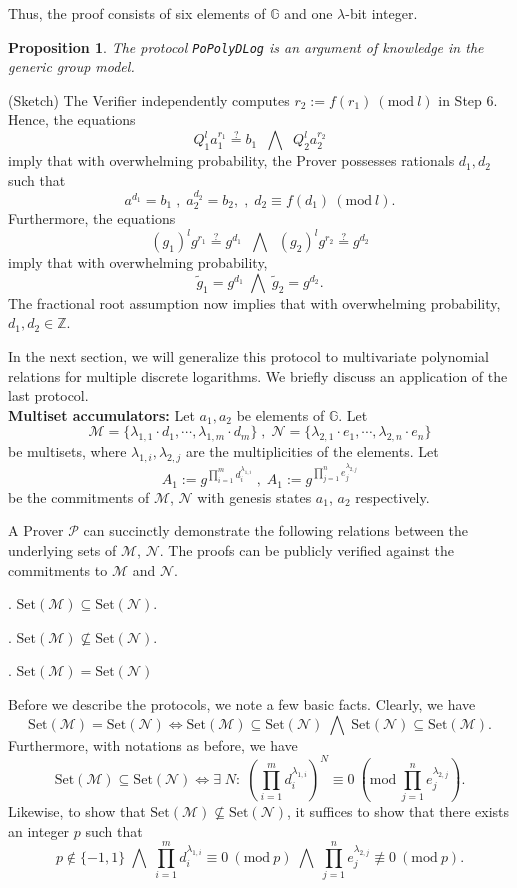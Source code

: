 \documentclass[11pt, lettersize, notitlepage, leqno, footskip=0.6cm]{article}
\newcommand{\bz}{\mathbb Z}
\newcommand{\pl}{\prod\limits}
\newcommand{\sett}{\mr{Set}}
\newcommand{\LRA}{\Longleftrightarrow}
\newcommand{\wti}{\widetilde}
\newcommand{\mc}{\mathcal}
\newcommand{\mb}{\mathbb}
\newcommand{\mr}{\mathrm}
\newcommand{\lam}{\lambda}
\newcommand{\sub}{\subseteq}
\newcommand{\nsub}{\nsubseteq}
\newcommand{\mP}{\mc{P}}
\newcommand{\vs}{\vspace{-0.15cm}}
\newcommand{\noin}{\noindent}
\newcommand{\op}{overwhelming probability}
\newcommand{\Mod}[1]{\ (\mathrm{mod}\ #1)}
\newtheorem{Prop}[Thm]{Proposition}
\numberwithin{equation}{section}
\begin{document}
\noindent Thus, the proof consists of six elements of $\mb{G}$ and one $\lam$-bit integer.

\begin{Prop} The protocol \verb|PoPolyDLog| is an argument of knowledge in the generic group
model.\end{Prop}

\begin{prf} (Sketch) The Verifier independently computes $r_2:= f(r_1)\Mod{l}$ in Step 6. Hence, the equations $$Q_1^{l}a_1^{r_1}\stackrel{?}{=} b_1\;\;\bigwedge\;\; Q_2^{l}a_2^{r_2}$$ imply that with \op, the Prover possesses rationals $d_1,d_2$ such that $$a^{d_1} = b_1\;,\;a_2^{d_2} = b_2,\;,\;d_2\equiv f(d_1)\Mod{l}.$$ Furthermore, the equations \vs $$(g_1)^lg^{r_1} \stackrel{?}{=} g^{d_1}\;\;\bigwedge\;\; (g_2)^lg^{r_2} \stackrel{?}{=} g^{d_2} $$ imply that with \op, \vs $$\wti{g}_1 = g^{d_1}\;\bigwedge\;\wti{g}_2 = g^{d_2}. $$ The fractional root assumption now implies that with \op, $d_1,d_2\in \bz$.\end{prf}

\noin In the next section, we will generalize this protocol to multivariate polynomial relations for multiple discrete logarithms. We briefly discuss an application of the last protocol.\\

\noin \textbf{Multiset accumulators:} Let $a_1,a_2$ be elements of $\mb{G}$. Let \vs $$\mc{M} = \{\lam_{1,1}\cdot d_1,\cdots, \lam_{1,m}\cdot d_m \}\;,\;\mc{N} = \{\lam_{2,1}\cdot e_1,\cdots, \lam_{2,n}\cdot e_n \}$$ be multisets, where $\lam_{1,i}, \lam_{2,j}$ are the multiplicities of the elements. Let \vs $$A_1:= g^{\pl_{i=1}^m d_i^{\lam_{1,i}}}\;,\; A_1:= g^{\pl_{j=1}^n e_j^{\lam_{2,j}}}$$ be the commitments of $\mc{M}$, $\mc{N}$ with genesis states $a_1$, $a_2$ respectively.

A Prover $\mP$ can succinctly demonstrate the following relations between the underlying sets of $\mc{M}$, $\mc{N}$. The proofs can be publicly verified against the commitments to $\mc{M}$ and $\mc{N}$.\vspace{0.1cm}

\noin 1. $\sett(\mc{M})\sub \sett(\mc{N})$.

\noin 2. $\sett(\mc{M})\nsub \sett(\mc{N})$.

\noin 3. $\sett(\mc{M}) = \sett(\mc{N})$ \vspace{0.1cm}

\noin Before we describe the protocols, we note a few basic facts. Clearly, we have \vs $$\sett(\mc{M}) = \sett(\mc{N})\LRA \sett(\mc{M}) \sub \sett(\mc{N})\;\bigwedge\; \sett(\mc{N}) \sub \sett(\mc{M}).$$ Furthermore, with notations as before, we have \vs $$\sett(\mc{M})\sub \sett(\mc{N})\LRA \exists\; N:\;(\pl_{i=1}^m d_i^{\lam_{1,i}})^N\equiv 0\Mod{\pl_{j=1}^n e_j^{\lam_{2,j}}}.$$ Likewise, to show that $\sett(\mc{M})\nsub \sett(\mc{N})$, it suffices to show that there exists an integer $p$ such that \vs $$p\notin \{-1,1\}   \;\bigwedge\;\pl_{i=1}^m d_i^{\lam_{1,i}}\equiv 0\Mod{p} \;\bigwedge\; \pl_{j=1}^n e_j^{\lam_{2,j}}\not\equiv 0\Mod{p}.$$ 
\end{document}

